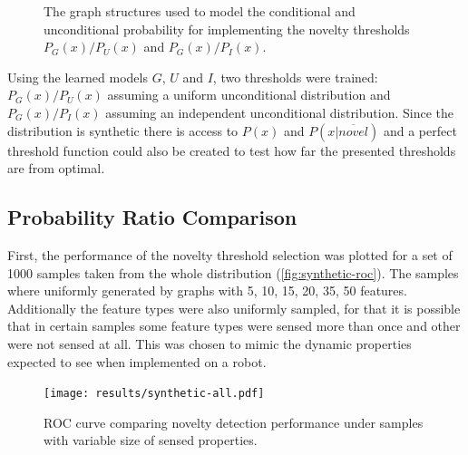 \documentclass[runningheads,a4paper]{llncs}
\begin{document}
\begin{figure}[h]
\centering

\qquad
{}
\qquad
{}

\caption{\label{fig:simple-experiment}The graph structures used to model the
         conditional and unconditional probability for implementing the novelty
         thresholds $P_G(x)/P_U(x)$ and $P_G(x)/P_I(x)$.}
\end{figure}

Using the learned models $G$, $U$ and $I$, two thresholds were trained:
$P_G(x)/P_U(x)$ assuming a uniform unconditional distribution
and $P_G(x)/P_I(x)$ assuming an independent unconditional distribution.
Since the distribution is synthetic there is access to $P(x)$ and $P(x|\overline{novel})$
and a perfect threshold function could also be created to test how far the
presented thresholds are from optimal.

\subsection{Probability Ratio Comparison}
First, the performance of the novelty threshold selection was plotted for a set
of 1000 samples taken from the whole distribution (\autoref{fig:synthetic-roc}).
The samples where uniformly generated by graphs with 5, 10, 15, 20, 35, 50 features.
Additionally the feature types were also uniformly sampled, for that it is possible
that in certain samples some feature types were sensed more than once and other were not
sensed at all.
This was chosen to mimic
the dynamic properties expected to see when implemented on a robot.

\begin{figure}[h]
\centering
\texttt{[image: results/synthetic-all.pdf]}

\caption{\label{fig:synthetic-roc}ROC curve comparing novelty detection performance
         under samples with variable size of sensed properties.}
\end{figure}
\end{document}
